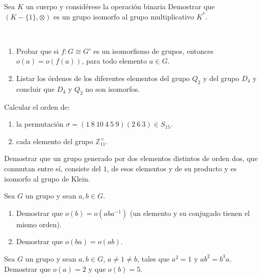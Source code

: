 \begin{ejercicio}\label{ej:2.29}
    Sea $K$ un cuerpo y considérese la operación binaria
    Demostrar que $(K - \{1\}, \otimes)$ es un grupo isomorfo al grupo multiplicativo $K^{\ast}$.
\end{ejercicio}

\begin{ejercicio}\label{ej:2.30}~
    \begin{enumerate}
        \item Probar que si $f : G \cong G'$ es un isomorfismo de grupos, entonces $o(a) = o(f(a))$, para todo elemento $a \in G$.
        \item Listar los órdenes de los diferentes elementos del grupo $Q_2$ y del grupo $D_4$ y concluir que $D_4$ y $Q_2$ no son isomorfos.
    \end{enumerate}
\end{ejercicio}

\begin{ejercicio}\label{ej:2.31}
    Calcular el orden de:
    \begin{enumerate}
        \item la permutación $\sigma = (1\ 8\ 10\ 4\ 5\ 9)(2\ 6\ 3) \in S_{15}$.
        \item cada elemento del grupo $\mathbb{Z}^{\times}_{11}$.
    \end{enumerate}
\end{ejercicio}

\begin{ejercicio}\label{ej:2.32}
    Demostrar que un grupo generado por dos elementos distintos de orden dos, que conmutan entre sí, consiste del $1$, de esos elementos y de su producto y es isomorfo al grupo de Klein.
\end{ejercicio}

\begin{ejercicio}\label{ej:2.33}
    Sea $G$ un grupo y sean $a, b \in G$.
    \begin{enumerate}
        \item Demostrar que $o(b) = o(aba^{-1})$ (un elemento y su conjugado tienen el mismo orden).
        \item Demostrar que $o(ba) = o(ab)$.
    \end{enumerate}
\end{ejercicio}

\begin{ejercicio}\label{ej:2.34}
    Sea $G$ un grupo y sean $a, b \in G$, $a \neq 1 \neq b$, tales que $a^2 = 1$ y $ab^2 = b^3a$. Demostrar que $o(a) = 2$ y que $o(b) = 5$.
\end{ejercicio}

